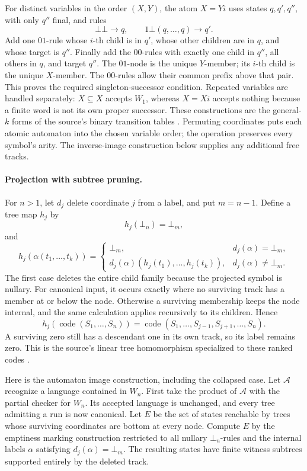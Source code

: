 For distinct variables in the order \((X,Y)\), the atom \(X=Yi\)
uses states \(q,q',q''\), with only \(q''\) final, and rules
\[
 \bot\bot\to q,\qquad 1\bot(q,\ldots,q)\to q'.
\]
Add one \(01\)-rule whose \(i\)-th child is in \(q'\), whose other
children are in \(q\), and whose target is \(q''\).
Finally add the \(00\)-rules with exactly one child in \(q''\),
all others in \(q\), and target \(q''\).
The \(01\)-node is the unique \(Y\)-member; its \(i\)-th child is
the unique \(X\)-member.  The \(00\)-rules allow their common prefix
above that pair.  This proves the required singleton-successor
condition.  Repeated variables are handled separately:
\(X\subseteq X\) accepts \(W_1\), whereas \(X=Xi\) accepts nothing
because a finite word is not its own proper successor.
These constructions are the general-\(k\) forms of the source's
binary transition tables \cite[Figures~3.8--3.11]{ComonEtAl2007}.
Permuting coordinates puts each atomic automaton into the chosen
variable order; the operation preserves every symbol's arity.
The inverse-image construction below supplies any additional free tracks.

\paragraph{Projection with subtree pruning.}
\label{sec:p09-wsks-pruning}
For \(n>1\), let \(d_j\) delete coordinate \(j\) from a label,
and put \(m=n-1\).
Define a tree map \(h_j\) by
\[
 h_j(\bot_n)=\bot_m,
\]
and
\[
 h_j(\alpha(t_1,\ldots,t_k))=
 \begin{cases}
  \bot_m,&d_j(\alpha)=\bot_m,\\
  d_j(\alpha)(h_j(t_1),\ldots,h_j(t_k)),
       &d_j(\alpha)\ne\bot_m.
 \end{cases}
\]
The first case deletes the entire child family because the projected
symbol is nullary.
For canonical input, it occurs exactly where no surviving track
has a member at or below the node.  Otherwise a surviving membership
keeps the node internal, and the same calculation applies recursively
to its children.  Hence
\[
 h_j(\operatorname{code}(S_1,\ldots,S_n))
   =\operatorname{code}(S_1,\ldots,S_{j-1},S_{j+1},\ldots,S_n).
\]
A surviving zero still has a descendant one in its own track, so
its label remains zero.  This is the source's linear tree
homomorphism specialized to these ranked codes
\cite[Proposition~3.2.12]{ComonEtAl2007}.

Here is the automaton image construction, including the collapsed case.
Let \(\mathcal A\) recognize a language contained in \(W_n\).
First take the product of \(\mathcal A\) with the partial checker
for \(W_n\).  Its accepted language is unchanged, and every tree
admitting a run is now canonical.
Let \(E\) be the set of states reachable by trees whose surviving
coordinates are bottom at every node.
Compute \(E\) by the emptiness marking construction restricted to
all nullary \(\bot_n\)-rules and the internal labels \(\alpha\) satisfying
\(d_j(\alpha)=\bot_m\).
The resulting states have finite witness subtrees supported entirely
by the deleted track.

